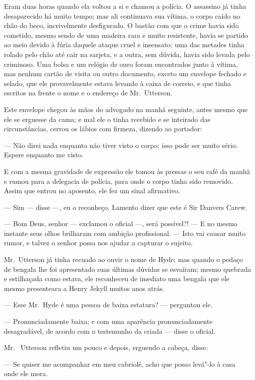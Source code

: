 Eram duas horas quando ela voltou a si e chamou a polícia.  O assassino
já tinha desaparecido há muito tempo; mas ali continuava sua vítima, o
corpo caído no chão do beco, incrivelmente desfigurado.  O bastão com
que o crime havia sido cometido, mesmo sendo de uma madeira rara e
muito resistente, havia se partido ao meio devido à fúria daquele
ataque cruel e insensato; uma das metades tinha rolado pelo chão até
cair na sarjeta, e a outra, sem dúvida, havia sido levada pelo
criminoso.  Uma bolsa e um relógio de ouro foram encontrados junto à
vítima, mas nenhum cartão de visita ou outro documento, exceto um
envelope fechado e selado, que ele provavelmente estava levando à caixa
de correio, e que tinha escritos na frente o nome e o endereço de Mr.~Utterson.

Este envelope chegou às mãos do advogado na manhã seguinte, antes mesmo
que ele se erguesse da cama; e mal ele o tinha recebido e se inteirado
das circunstâncias, cerrou os lábios com firmeza, dizendo ao portador:

--- Não direi nada enquanto não tiver visto o corpo; isso pode ser muito
sério.  Espere enquanto me visto.

E com a mesma gravidade de expressão ele tomou às pressas o seu café da
manhã e rumou para a delegacia de polícia, para onde o corpo tinha sido		
removido.  Assim que entrou no aposento, ele fez um sinal afirmativo.

--- Sim --- disse ---, eu o reconheço.  Lamento dizer que este é Sir
Danvers Carew. 

--- Bom Deus, senhor --- exclamou o oficial ---, será possível?!  --- E no
mesmo instante seus olhos brilharam com ambição profissional. --- Isto
vai causar muito rumor, e talvez o senhor possa nos ajudar a capturar o
sujeito.

Mr.~Utterson já tinha recuado ao ouvir o nome de Hyde; mas quando o
pedaço de bengala lhe foi apresentado suas últimas dúvidas se esvaíram;
mesmo quebrada e estilhaçada como estava, ele reconheceu de imediato
uma bengala que ele mesmo presenteara a Henry Jekyll muitos anos atrás.

--- Esse Mr.~Hyde é uma pessoa de baixa estatura? --- perguntou ele.

--- Pronunciadamente baixa; e com uma aparência pronunciadamente
desagradável, de acordo com o testemunho da criada --- disse o oficial.

Mr.~ Utterson refletiu um pouco e depois, erguendo a cabeça, disse: 

--- Se quiser me acompanhar em meu cabriolé, acho que posso levá"-lo à
casa onde ele mora.

